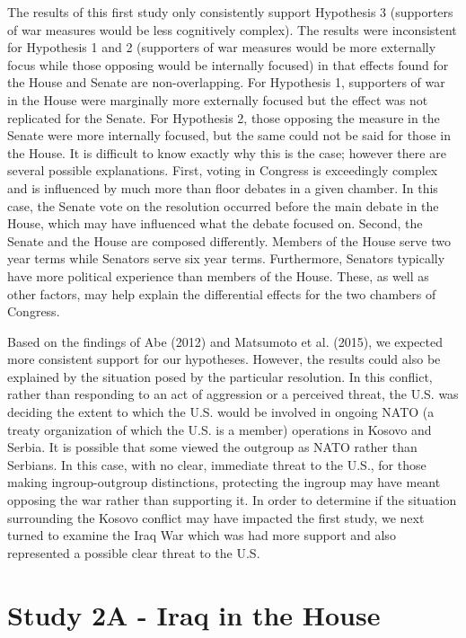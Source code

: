 \documentclass[english,,man]{apa6}
\begin{document}
The results of this first study only consistently support Hypothesis 3 (supporters of war measures would be less cognitively complex). The results were inconsistent for Hypothesis 1 and 2 (supporters of war measures would be more externally focus while those opposing would be internally focused) in that effects found for the House and Senate are non-overlapping. For Hypothesis 1, supporters of war in the House were marginally more externally focused but the effect was not replicated for the Senate. For Hypothesis 2, those opposing the measure in the Senate were more internally focused, but the same could not be said for those in the House.
It is difficult to know exactly why this is the case; however there are several possible explanations. First, voting in Congress is exceedingly complex and is influenced by much more than floor debates in a given chamber. In this case, the Senate vote on the resolution occurred before the main debate in the House, which may have influenced what the debate focused on. Second, the Senate and the House are composed differently. Members of the House serve two year terms while Senators serve six year terms. Furthermore, Senators typically have more political experience than members of the House. These, as well as other factors, may help explain the differential effects for the two chambers of Congress.

Based on the findings of Abe (2012) and Matsumoto et al. (2015), we expected more consistent support for our hypotheses. However, the results could also be explained by the situation posed by the particular resolution. In this conflict, rather than responding to an act of aggression or a perceived threat, the U.S. was deciding the extent to which the U.S. would be involved in ongoing NATO (a treaty organization of which the U.S. is a member) operations in Kosovo and Serbia. It is possible that some viewed the outgroup as NATO rather than Serbians. In this case, with no clear, immediate threat to the U.S., for those making ingroup-outgroup distinctions, protecting the ingroup may have meant opposing the war rather than supporting it. In order to determine if the situation surrounding the Kosovo conflict may have impacted the first study, we next turned to examine the Iraq War which was had more support and also represented a possible clear threat to the U.S.

\hypertarget{study-2a---iraq-in-the-house}{%
\section{Study 2A - Iraq in the House}\label{study-2a---iraq-in-the-house}}
\end{document}
